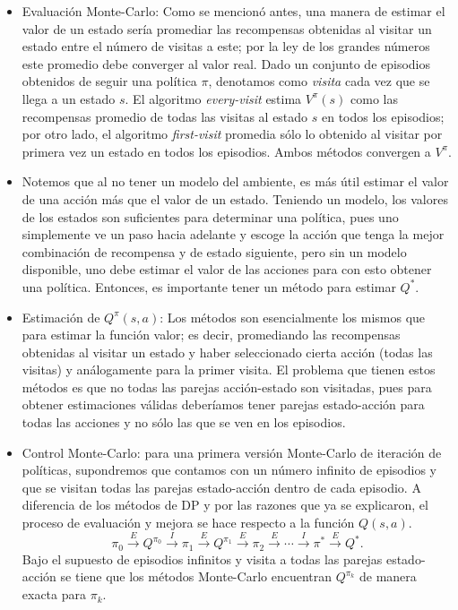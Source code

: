 \documentclass[11pt]{article}
\theoremstyle{plain}
\begin{document}
\begin{itemize}
\item Evaluación Monte-Carlo: Como se mencionó antes, una manera de estimar el valor de un estado sería promediar las recompensas obtenidas al visitar un estado entre el número de visitas a este; por la ley de los grandes números este promedio debe converger al valor real. Dado un conjunto de episodios obtenidos de seguir una política $\pi$, denotamos como \textit{visita} cada vez que se llega a un estado $s$. El algoritmo \textit{every-visit} estima $V^\pi (s)$ como las recompensas promedio de todas las visitas al estado $s$ en todos los episodios; por otro lado, el algoritmo \textit{first-visit} promedia sólo lo obtenido al visitar por primera vez un estado en todos los episodios. Ambos métodos convergen a $V^\pi$.
\item Notemos que al no tener un modelo del ambiente, es más útil estimar el valor de una acción más que el valor de un estado. Teniendo un modelo, los valores de los estados son suficientes para determinar una política, pues uno simplemente ve un paso hacia adelante y escoge la acción que tenga la mejor combinación de recompensa y de estado siguiente, pero sin un modelo disponible, uno debe estimar el valor de las acciones para con esto obtener una política. Entonces, es importante tener un método para estimar $Q^\ast$.
\item Estimación de $Q^\pi(s,a)$: Los métodos son esencialmente los mismos que para estimar la función valor; es decir, promediando las recompensas obtenidas al visitar un estado y haber seleccionado cierta acción (todas las visitas) y análogamente para la primer visita. El problema que tienen estos métodos es que no todas las parejas acción-estado son visitadas, pues para obtener estimaciones válidas deberíamos tener parejas estado-acción para todas las acciones y no sólo las que se ven en los episodios. 
\item Control Monte-Carlo: para una primera versión Monte-Carlo de iteración de políticas, supondremos que contamos con un número infinito de episodios y que se visitan todas las parejas estado-acción dentro de cada episodio. A diferencia de los métodos de DP y por las razones que ya se explicaron, el proceso de evaluación y mejora se hace respecto a la función $Q(s,a)$.
\[ \pi_0 \xrightarrow{E} Q^{\pi_0} \xrightarrow{I} \pi_1 \xrightarrow{E} Q^{\pi_1} \xrightarrow{E} \pi_2 \xrightarrow{E} \cdots \xrightarrow{I} \pi^\ast \xrightarrow{E} Q^\ast.  \]
Bajo el supuesto de episodios infinitos y visita a todas las parejas estado-acción se tiene que los métodos Monte-Carlo encuentran $Q^{\pi_k}$ de manera exacta para $\pi_k$.\\

\end{itemize}
\end{document}
